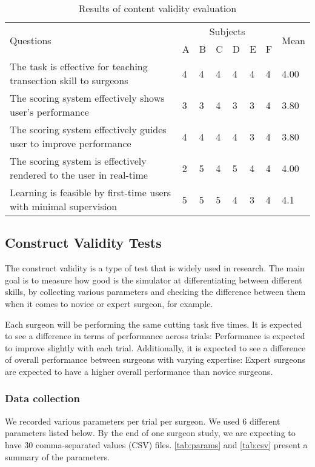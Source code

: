 \begin{table}
\small
\centering
\begin{tabular}{p{6cm}p{0.5cm}p{0.5cm}p{0.5cm}p{0.5cm}p{0.5cm}p{0.5cm}p{0.8cm}}
  \multirow{2}{4em}{Questions} & \multicolumn{6}{c}{Subjects} & \multirow{2}{4em}{Mean} \\
  \cmidrule{2-7}
  & A & B & C & D & E & F &\\
  \toprule
  The task is effective for teaching transection skill to surgeons
  & 4& 4& 4& 4 & 4& 4 & 4.00\\
  \midrule
  The scoring system effectively shows user's performance
  & 3& 3& 4 & 3 & 3 & 4 & 3.80\\
  \midrule
  The scoring system effectively guides user to improve performance
  & 4 & 4 & 4& 4& 3 & 4 & 3.80\\
  \midrule
  The scoring system is effectively rendered to the user in real-time
  & 2 & 5 & 4& 5& 4 & 4 & 4.00\\
  \midrule
  Learning is feasible by first-time users with minimal supervision & 5 & 5 & 5 & 4 & 3& 4 & 4.1\\
  \bottomrule
\end{tabular}
\caption{Results of content validity evaluation}\label{tab:contentTable2}
\end{table}

\subsection{Construct Validity Tests}\label{sec:construct}

The construct validity is a type of test that is widely used in research. The main goal is to measure how good is the simulator at differentiating between different skills, by collecting various parameters and checking the difference between them when it comes to novice or expert surgeon, for example.

Each surgeon will be performing the same cutting task five times. It is expected to see a difference in terms of performance across trials: Performance is expected to improve slightly with each trial. Additionally, it is expected to see a difference of overall performance between surgeons with varying expertise: Expert surgeons are expected to have a higher overall performance than novice surgeons.

\subsubsection{Data collection}
We recorded various parameters per trial per surgeon. We used 6 different parameters listed below. By the end of one surgeon study, we are expecting to have 30 comma-separated values (CSV) files. \autoref{tab:params} and \autoref{tab:csv} present a summary of the parameters.

